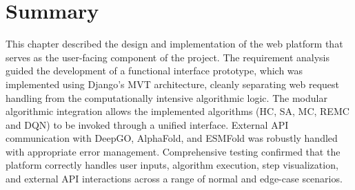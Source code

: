 \section{Summary}
\label{cap3:sec_summary}

This chapter described the design and implementation of the web platform that serves as the user-facing component of the project. The requirement analysis guided the development of a functional interface prototype, which was implemented using Django's MVT architecture, cleanly separating web request handling from the computationally intensive algorithmic logic. The modular algorithmic integration allows the implemented algorithms (HC, SA, MC, REMC and DQN) to be invoked through a unified interface. External API communication with DeepGO, AlphaFold, and ESMFold was robustly handled with appropriate error management. Comprehensive testing confirmed that the platform correctly handles user inputs, algorithm execution, step visualization, and external API interactions across a range of normal and edge-case scenarios.
